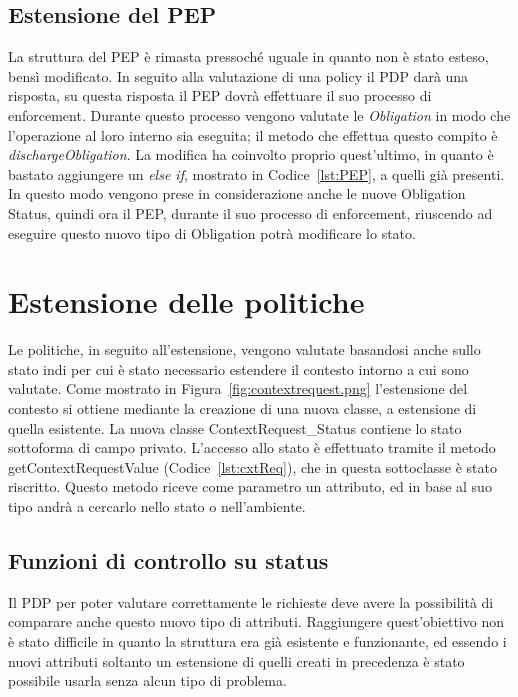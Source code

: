 \subsection{Estensione del PEP}
\label{sub:estensione_PEP}
La struttura del \ac{PEP} è rimasta pressoché uguale in quanto non è stato esteso, bensì modificato.
In seguito alla valutazione di una policy il \ac{PDP} darà una risposta, su questa risposta il \ac{PEP} dovrà effettuare il suo processo di enforcement.
Durante questo processo vengono valutate le \textit{Obligation} in modo che l'operazione al loro interno sia eseguita; il metodo che effettua questo compito è 
\textit{dischargeObligation}. La modifica ha coinvolto proprio quest'ultimo, in quanto è bastato aggiungere un \textit{else if}, mostrato in Codice~\ref{lst:PEP}, a quelli già presenti.
In questo modo vengono prese in considerazione anche le nuove Obligation Status, quindi ora il \ac{PEP}, durante il suo processo di enforcement, riuscendo ad eseguire questo nuovo tipo di Obligation potrà modificare lo stato.


\section{Estensione delle politiche}
\label{sec:estensione_politiche}

Le politiche, in seguito all'estensione, vengono valutate basandosi anche sullo stato indi per cui è stato necessario estendere il contesto intorno a cui sono valutate. Come mostrato in Figura~\ref{fig:contextrequest.png} l'estensione del contesto si ottiene mediante la creazione di una nuova classe, a estensione di quella esistente.
La nuova classe ContextRequest\_Status contiene lo stato sottoforma di campo privato. L'accesso allo stato è effettuato tramite il metodo getContextRequestValue (Codice~\ref{lst:cxtReq}), che in questa sottoclasse è stato riscritto.
Questo metodo riceve come parametro un attributo, ed in base al suo tipo andrà a cercarlo nello stato o nell'ambiente.

\subsection{Funzioni di controllo su status}
\label{sub:funzioni_controllo_status}

Il \ac{PDP} per poter valutare correttamente le richieste deve avere la possibilità di comparare anche questo nuovo tipo di attributi.
Raggiungere quest'obiettivo non è stato difficile in quanto la struttura era già esistente e funzionante, ed essendo i nuovi attributi soltanto un estensione di quelli 
creati in precedenza è stato possibile usarla senza alcun tipo di problema.\par

